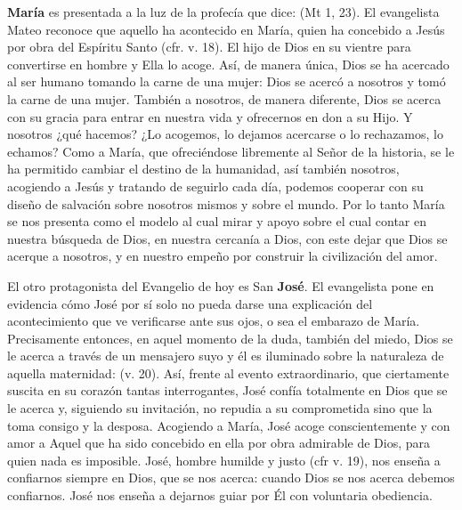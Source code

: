 \textbf{María} es presentada a la luz de la profecía que dice:  (Mt 1, 23). El evangelista Mateo reconoce que aquello ha acontecido en María, quien ha concebido a Jesús por obra del Espíritu Santo (cfr. v. 18). El hijo de Dios  en su vientre para convertirse en hombre y Ella lo acoge. Así, de manera única, Dios se ha acercado al ser humano tomando la carne de una mujer: Dios se acercó a nosotros y tomó la carne de una mujer. También a nosotros, de manera diferente, Dios se acerca con su gracia para entrar en nuestra vida y ofrecernos en don a su Hijo. Y nosotros ¿qué hacemos? ¿Lo acogemos, lo dejamos acercarse o lo rechazamos, lo echamos? Como a María, que ofreciéndose libremente al Señor de la historia, se le ha permitido cambiar el destino de la humanidad, así también nosotros, acogiendo a Jesús y tratando de seguirlo cada día, podemos cooperar con su diseño de salvación sobre nosotros mismos y sobre el mundo. Por lo tanto María se nos presenta como el modelo al cual mirar y apoyo sobre el cual contar en nuestra búsqueda de Dios, en nuestra cercanía a Dios, con este dejar que Dios se acerque a nosotros, y en nuestro empeño por construir la civilización del amor.

El otro protagonista del Evangelio de hoy es San \textbf{José}. El evangelista pone en evidencia cómo José por sí solo no pueda darse una explicación del acontecimiento que ve verificarse ante sus ojos, o sea el embarazo de María. Precisamente entonces, en aquel momento de la duda, también del miedo, Dios se le acerca a través de un mensajero suyo y él es iluminado sobre la naturaleza de aquella maternidad:  (v. 20). Así, frente al evento extraordinario, que ciertamente suscita en su corazón tantas interrogantes, José confía totalmente en Dios que se le acerca y, siguiendo su invitación, no repudia a su comprometida sino que la toma consigo y la desposa. Acogiendo a María, José acoge conscientemente y con amor a Aquel que ha sido concebido en ella por obra admirable de Dios, para quien nada es imposible. José, hombre humilde y justo (cfr v. 19), nos enseña a confiarnos siempre en Dios, que se nos acerca: cuando Dios se nos acerca debemos confiarnos. José nos enseña a dejarnos guiar por Él con voluntaria obediencia.

